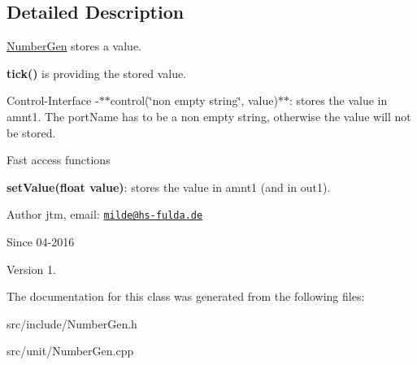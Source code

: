 \subsection{Detailed Description}
\hyperlink{classunit_1_1NumberGen}{Number\-Gen} stores a value.


\begin{DoxyItemize}
\item {\bfseries tick()} is providing the stored value.
\end{DoxyItemize}

Control-\/\-Interface -\/$\ast$$\ast$control(\char`\"{}non empty string\char`\"{}, value)$\ast$$\ast$\-: stores the value in amnt1. The port\-Name has to be a non empty string, otherwise the value will not be stored.

Fast access functions
\begin{DoxyItemize}
\item {\bfseries set\-Value(float value)}\-: stores the value in amnt1 (and in out1).
\end{DoxyItemize}

\begin{DoxyAuthor}{Author}
jtm, email\-:  \href{mailto:milde@hs-fulda.de}{\tt milde@hs-\/fulda.\-de} 
\end{DoxyAuthor}
\begin{DoxySince}{Since}
04-\/2016 
\end{DoxySince}
\begin{DoxyVersion}{Version}
1. 
\end{DoxyVersion}


The documentation for this class was generated from the following files\-:\begin{DoxyCompactItemize}
\item 
src/include/Number\-Gen.\-h\item 
src/unit/Number\-Gen.\-cpp\end{DoxyCompactItemize}
